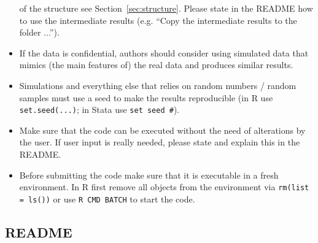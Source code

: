 \documentclass[12pt,a4paper]{article}
\begin{document}
\begin{itemize}
  of the structure see Section~\ref{sec:structure}. Please state in the README
  how to use the intermediate results (e.g. ``Copy the intermediate results to
  the folder ...'').
\item If the data is confidential, authors should consider using simulated data
  that mimics (the main features of) the real data and produces similar results.
\item Simulations and everything else that relies on random numbers / random
  samples {must} use a seed to make the results reproducible (in \textsf{R} use
  \texttt{set.seed(...)}; in \textsf{Stata} use \texttt{set seed \#}).
\item Make sure that the code can be executed without the need of alterations by
  the user. If user input is really needed, please state and explain this in the
  README.
\item Before submitting the code make sure that it is executable in a fresh
  environment. In \textsf{R} first remove all objects from the environment via
  \texttt{rm(list = ls())} or use \texttt{R CMD BATCH} to start the code.
\end{itemize}

\subsection{README}
\end{document}
